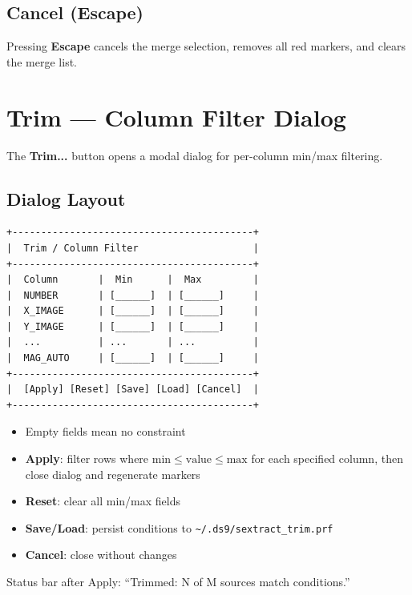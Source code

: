 \documentclass[11pt,fleqn]{book}
\begin{document}
\subsection{Cancel (Escape)}

Pressing \textbf{Escape} cancels the merge selection, removes all red markers, and clears the merge list.


\section{Trim --- Column Filter Dialog}

The \textbf{Trim...} button opens a modal dialog for per-column min/max filtering.

\subsection{Dialog Layout}

\begin{codebox}
\begin{lstlisting}[numbers=none]
+------------------------------------------+
|  Trim / Column Filter                    |
+------------------------------------------+
|  Column       |  Min      |  Max         |
|  NUMBER       | [______]  | [______]     |
|  X_IMAGE      | [______]  | [______]     |
|  Y_IMAGE      | [______]  | [______]     |
|  ...          | ...       | ...          |
|  MAG_AUTO     | [______]  | [______]     |
+------------------------------------------+
|  [Apply] [Reset] [Save] [Load] [Cancel]  |
+------------------------------------------+
\end{lstlisting}
\end{codebox}

\begin{itemize}[leftmargin=2em]
  \item Empty fields mean no constraint
  \item \textbf{Apply}: filter rows where $\text{min} \leq \text{value} \leq \text{max}$ for each specified column, then close dialog and regenerate markers
  \item \textbf{Reset}: clear all min/max fields
  \item \textbf{Save/Load}: persist conditions to \texttt{\textasciitilde/.ds9/sextract\_trim.prf}
  \item \textbf{Cancel}: close without changes
\end{itemize}

Status bar after Apply: ``Trimmed: N of M sources match conditions.''
\end{document}
